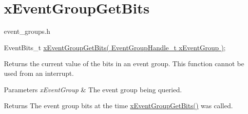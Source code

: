 \hypertarget{group__xEventGroupGetBits}{}\section{x\+Event\+Group\+Get\+Bits}
\label{group__xEventGroupGetBits}
event\+\_\+groups.\+h 
\begin{DoxyPre}
   EventBits\_t \hyperlink{event__groups_8h_a0ae86f092fb07ccb475ae938f9a12584}{xEventGroupGetBits( EventGroupHandle\_t xEventGroup )};
\end{DoxyPre}


Returns the current value of the bits in an event group. This function cannot be used from an interrupt.


\begin{DoxyParams}{Parameters}
{\em x\+Event\+Group} & The event group being queried.\\
\hline
\end{DoxyParams}
\begin{DoxyReturn}{Returns}
The event group bits at the time \hyperlink{event__groups_8h_a0ae86f092fb07ccb475ae938f9a12584}{x\+Event\+Group\+Get\+Bits()} was called. 
\end{DoxyReturn}
